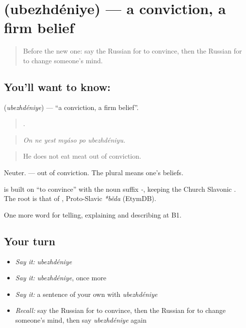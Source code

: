 \section[\texorpdfstring{\ru{убеждение} (ubezhdéniye)}{убеждение (ubezhdéniye)}]{ (ubezhdéniye) — a conviction, a firm belief}

\label{lesson:RU-C339-ubezhdenie}



\begin{quote}
Before the new one: say the Russian for to convince, then the Russian for to change someone’s mind.
\end{quote}

\subsection*{You'll want to know: }
\textbf{} (\emph{ubezhdéniye}) — \textquotedblleft{}a conviction, a firm belief\textquotedblright{}.

\begin{quote}
     .
\end{quote}

\begin{quote}
\emph{On ne yest myáso po ubezhdéniyu.}
\end{quote}

\begin{quote}
He does not eat meat out of conviction.
\end{quote}

Neuter. \emph{ } — out of conviction. The plural \emph{} means one’s beliefs.

\begin{cousinweb}
\textbf{} is built on \emph{} \textquotedblleft{}to convince\textquotedblright{} with the noun suffix \emph{-}, keeping the Church Slavonic \emph{}. The root is that of \emph{}, Proto-Slavic \emph{*běda} (EtymDB).
\end{cousinweb}

\begin{grammarlens}[title={What you've built}]
One more word for telling, explaining and describing at B1.
\end{grammarlens}

\subsection*{Your turn}
\begin{itemize}
\raggedright
  \item \emph{Say it:} \emph{ubezhdéniye}
  \item \emph{Say it:} \emph{ubezhdéniye}, once more
  \item \emph{Say it:} a sentence of your own with \emph{ubezhdéniye}
  \item \emph{Recall:} say the Russian for to convince, then the Russian for to change someone’s mind, then say \emph{ubezhdéniye} again
\end{itemize}

